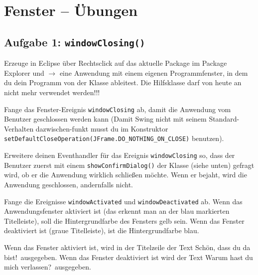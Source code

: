 \clearpage

\rehead[]{\textcolor{lightblue}{AvHG, Inf, My}}
\lohead[]{\textcolor{lightblue}{AvHG, Inf, My}}

\section{Fenster -- Übungen}

\subsection{Aufgabe 1: \lstinline|windowClosing()|}

\begin{compactenum}[a)]
\item Erzeuge in Eclipse über Rechtsclick auf das aktuelle Package im Package
Explorer und  $\rightarrow$  eine Anwendung mit einem
eigenen Programmfenster, in dem du dein Programm von der Klasse 
ableitest. Die Hilfsklasse  darf von heute an nicht mehr
verwendet werden!!!

Fange das Fenster-Ereignis \lstinline|windowClosing| ab, damit die Anwendung
vom Benutzer geschlossen werden kann (Damit Swing nicht mit seinem
Standard-Verhalten dazwischen-funkt musst du im Konstruktor
\lstinline|setDefaultCloseOperation(JFrame.DO_NOTHING_ON_CLOSE)| benutzen).

\item Erweitere deinen Eventhandler für das Ereignis \lstinline|windowClosing|
so, dass der Benutzer zuerst mit einem \lstinline|showConfirmDialog()| der
Klasse  (siehe unten) gefragt wird, ob er die Anwendung
wirklich schließen möchte. Wenn er bejaht, wird die Anwendung geschlossen,
andernfalls nicht.

\item Fange die Ereignisse \lstinline|windowActivated| und
\lstinline|windowDeactivated| ab. Wenn das Anwendungsfenster aktiviert ist (das
erkennt man an der blau markierten Titelleiste), soll die Hintergrundfarbe des
Fensters gelb sein. Wenn das Fenster deaktiviert ist (graue Titelleiste), ist
die Hintergrundfarbe blau.

\item Wenn das Fenster aktiviert ist, wird in der Titelzeile der Text
\glqq Schön, dass du da bist!\grqq\ ausgegeben. Wenn das Fenster deaktiviert ist
wird der Text \glqq Warum hast du mich verlassen?\grqq\ ausgegeben.
\end{compactenum}

